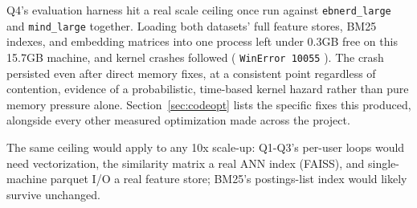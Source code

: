 \documentclass[11pt]{article}
\newcommand{\code}[1]{%
    \colorbox{gray!40}{\texttt{#1}}%
}
\begin{document}
Q4's evaluation harness hit a real scale ceiling once run against \code{ebnerd\_large} and
\code{mind\_large} together. Loading both datasets' full feature stores, BM25 indexes, and
embedding matrices into one process left under 0.3GB free on this 15.7GB machine, and kernel
crashes followed (\code{WinError 10055}). The crash persisted even after direct memory fixes, at
a consistent point regardless of contention, evidence of a probabilistic, time-based kernel
hazard rather than pure memory pressure alone. Section~\ref{sec:codeopt} lists the specific
fixes this produced, alongside every other measured optimization made across the project.

The same ceiling would apply to any 10x scale-up: Q1-Q3's per-user loops would need
vectorization, the similarity matrix a real ANN index (FAISS), and single-machine parquet I/O a
real feature store; BM25's postings-list index would likely survive unchanged.
\end{document}
